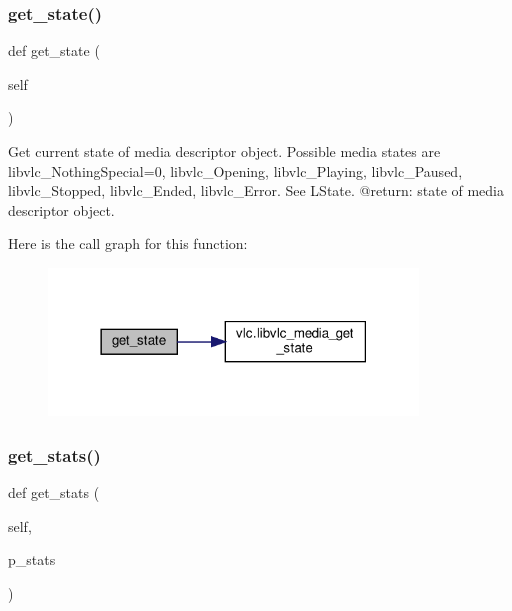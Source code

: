\subsubsection{\texorpdfstring{get\+\_\+state()}{get\_state()}}
{\footnotesize\ttfamily def get\+\_\+state (\begin{DoxyParamCaption}\item[{}]{self }\end{DoxyParamCaption})}

\begin{DoxyVerb}Get current state of media descriptor object. Possible media states are
libvlc_NothingSpecial=0, libvlc_Opening, libvlc_Playing, libvlc_Paused,
libvlc_Stopped, libvlc_Ended, libvlc_Error.
See L{State}.
@return: state of media descriptor object.
\end{DoxyVerb}
 Here is the call graph for this function\+:
\nopagebreak
\begin{figure}[H]
\begin{center}
\leavevmode
\includegraphics[width=278pt]{classvlc_1_1_media_adf1f4fd59e6ea40d38c2b677a757007f_cgraph}
\end{center}
\end{figure}
\mbox{\label{classvlc_1_1_media_a26b214f5903f07d59990ad524ef188b0}} 
\subsubsection{\texorpdfstring{get\+\_\+stats()}{get\_stats()}}
{\footnotesize\ttfamily def get\+\_\+stats (\begin{DoxyParamCaption}\item[{}]{self,  }\item[{}]{p\+\_\+stats }\end{DoxyParamCaption})}

